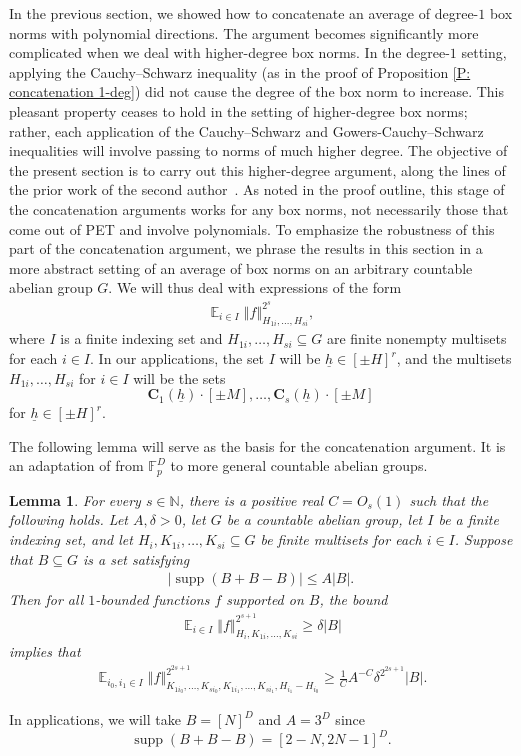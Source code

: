 \documentclass[11pt]{amsart}
\newtheorem{lemma}{Lemma}[section]
\theoremstyle{definition}
\DeclareMathOperator*{\E}{\mathbb{E}}
\newcommand{\F}{{\mathbb F}}
\newcommand{\bc}{{\mathbf{C}}}
\newcommand{\uh}{{\underline{h}}}
\DeclareMathOperator{\supp}{supp}
\newcommand{\norm}[1]{\left\Vert #1\right\Vert}
\begin{document}
In the previous section, we showed how to concatenate an average of degree-$1$ box norms with polynomial directions. The argument becomes significantly more complicated when we deal with higher-degree box norms. In the degree-$1$ setting, applying the Cauchy--Schwarz inequality (as in the proof of Proposition \ref{P: concatenation 1-deg}) did not cause the degree of the box norm to increase. This pleasant property ceases to hold in the setting of higher-degree box norms; rather, each application of the Cauchy--Schwarz and Gowers-Cauchy--Schwarz inequalities will involve passing to norms of much higher degree. The objective of the present section is to carry out this higher-degree argument, along the lines of the prior work of the second author~\cite{Kuc23}. As noted in the proof outline, this stage of the concatenation arguments works for any box norms, not necessarily those that come out of PET and involve polynomials. To emphasize the robustness of this part of the concatenation argument, we phrase the results in this section in a more abstract setting of an average of box norms on an arbitrary countable abelian group $G$.  We will thus deal with expressions of the form
\begin{align*}
    \E_{i\in I}\norm{f}_{H_{1i}, \ldots, H_{si}}^{2^s},
\end{align*}
where $I$ is a finite indexing set and 
$H_{1i}, \ldots, H_{si}\subseteq G$ are finite nonempty multisets for each $i \in I$. In our applications, the set $I$ will be $\uh\in[\pm H]^{r}$, and the {multisets} $H_{1i}, \ldots, H_{si}$ for $i\in I$ will be the sets $$\bc_1(\uh)\cdot[\pm M], \ldots, \bc_s(\uh)\cdot[\pm M]$$ for $\uh\in[\pm H]^r$.

The following lemma will serve as the basis for the concatenation argument. It is an adaptation of \cite[Lemma 2.2]{Kuc23} from $\F_p^D$ to more general countable abelian groups.
\begin{lemma}\label{L: concatenation lemma}
For every $s\in \mathbb{N}$, there is a positive real $C=O_s(1)$ such that the following holds.  Let $A, \delta>0$, 
    let $G$ be a countable abelian group, let $I$ be a finite indexing set, and let $H_i, K_{1i}, \ldots, K_{si}\subseteq G$ be finite multisets for each $i\in I$.  Suppose that $B \subseteq G$ is a set
    satisfying 
    \begin{align*}
        |\supp(B+B-B)|\leq A|B|.
    \end{align*}
Then for all $1$-bounded functions $f$ supported on $B$, the bound
    \begin{align*}
        {\E_{i\in I}\norm{f}_{H_i, K_{1i}, \ldots, K_{si}}^{2^{s+1}}}\geq \delta |B|
    \end{align*}
    implies that
    \begin{align*}
        \E_{i_0, i_1\in I}\norm{f}_{K_{1 i_0}, \ldots, K_{s i_0}, K_{1 i_1}, \ldots, K_{s i_1}, H_{i_1}-H_{i_0}}^{2^{2s+1}}\geq \frac{1}{C} A^{-C} \delta^{2^{2s+1}} |B|.
    \end{align*}
\end{lemma}
In applications, we will take $B = [N]^D$ and $A=3^D$ since $$\supp(B+B - B) = [2-N, 2N-1]^D.$$ 
\end{document}
